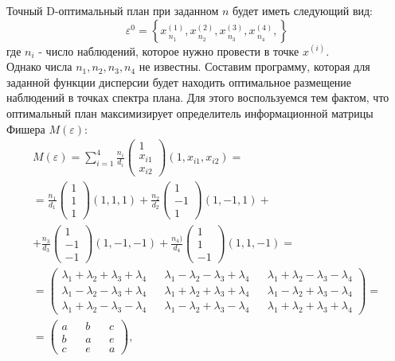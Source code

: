 Точный D-оптимальный план при заданном $n$ будет иметь следующий вид:
\begin{equation}
\varepsilon^{0} = \left \{ 
\underset{n_1} {x^{(1)}},
\underset{n_2} {x^{(2)}},
\underset{n_3} {x^{(3)}},
\underset{n_4} {x^{(4)}},
\right \}
\end{equation}
где $n_i$ - число наблюдений, которое нужно провести в точке $x^{(i)}$.\\
Однако числа $n_1, n_2, n_3, n_4$ не известны. Составим программу, которая для заданной функции дисперсии будет находить оптимальное размещение наблюдений в точках спектра плана.
Для этого воспользуемся тем фактом, что оптимальный план максимизирует определитель информационной матрицы Фишера $M(\varepsilon)$:
\begin{multline*} 
M(\varepsilon) = \sum_{i = 1}^{4} \frac{n_i} {d_i} 
\begin{pmatrix}1 \\ x_{i1} \\ x_{i2} \end{pmatrix}
(1, x_{i1}, x_{i2}) = \\
= \frac {n_1} {d_1} \begin{pmatrix}1 \\ 1 \\ 1\end{pmatrix} (1, 1, 1) + 
\frac {n_2} {d_2} \begin{pmatrix}1 \\ -1 \\ 1\end{pmatrix} (1, -1, 1) + \\
+ \frac {n_3} {d_3} \begin{pmatrix}1 \\ -1 \\ -1\end{pmatrix} (1, -1, -1) +
\frac {n_4)} {d_4} \begin{pmatrix} 1 \\ 1 \\ -1\end{pmatrix} (1, 1, -1) = \\
= \begin{pmatrix}
\lambda_1 + \lambda_2 + \lambda_3 + \lambda_4 &&
\lambda_1 - \lambda_2 - \lambda_3 + \lambda_4 &&
\lambda_1 + \lambda_2 - \lambda_3 - \lambda_4
\\
\lambda_1 - \lambda_2 - \lambda_3 + \lambda_4 &&
\lambda_1 + \lambda_2 + \lambda_3 + \lambda_4 &&
\lambda_1 - \lambda_2 + \lambda_3 - \lambda_4
\\
\lambda_1 + \lambda_2 - \lambda_3 - \lambda_4 &&
\lambda_1 - \lambda_2 + \lambda_3 - \lambda_4 &&
\lambda_1 + \lambda_2 + \lambda_3 + \lambda_4
\end{pmatrix} = \\
= \begin{pmatrix}
a && b && c \\
b && a && e \\
c && e && a
\end{pmatrix},
\end{multline*}
